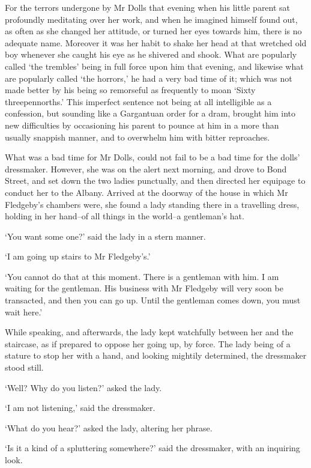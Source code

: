 For the terrors undergone by Mr Dolls that evening when his little
parent sat profoundly meditating over her work, and when he imagined
himself found out, as often as she changed her attitude, or turned her
eyes towards him, there is no adequate name. Moreover it was her habit
to shake her head at that wretched old boy whenever she caught his eye
as he shivered and shook. What are popularly called ‘the trembles’ being
in full force upon him that evening, and likewise what are popularly
called ‘the horrors,’ he had a very bad time of it; which was not
made better by his being so remorseful as frequently to moan ‘Sixty
threepennorths.’ This imperfect sentence not being at all intelligible
as a confession, but sounding like a Gargantuan order for a dram,
brought him into new difficulties by occasioning his parent to pounce
at him in a more than usually snappish manner, and to overwhelm him with
bitter reproaches.

What was a bad time for Mr Dolls, could not fail to be a bad time for
the dolls’ dressmaker. However, she was on the alert next morning, and
drove to Bond Street, and set down the two ladies punctually, and then
directed her equipage to conduct her to the Albany. Arrived at the
doorway of the house in which Mr Fledgeby’s chambers were, she found a
lady standing there in a travelling dress, holding in her hand--of all
things in the world--a gentleman’s hat.

‘You want some one?’ said the lady in a stern manner.

‘I am going up stairs to Mr Fledgeby’s.’

‘You cannot do that at this moment. There is a gentleman with him. I am
waiting for the gentleman. His business with Mr Fledgeby will very soon
be transacted, and then you can go up. Until the gentleman comes down,
you must wait here.’

While speaking, and afterwards, the lady kept watchfully between her and
the staircase, as if prepared to oppose her going up, by force. The
lady being of a stature to stop her with a hand, and looking mightily
determined, the dressmaker stood still.

‘Well? Why do you listen?’ asked the lady.

‘I am not listening,’ said the dressmaker.

‘What do you hear?’ asked the lady, altering her phrase.

‘Is it a kind of a spluttering somewhere?’ said the dressmaker, with an
inquiring look.

